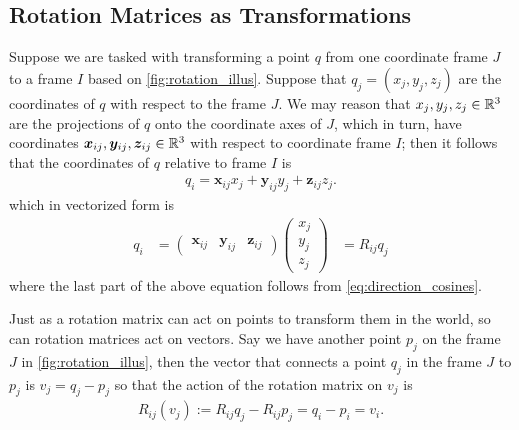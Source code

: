 \subsection{Rotation Matrices as Transformations}
%
Suppose we are tasked with transforming a point $q$ from one coordinate frame  $J$ to a frame $I$ based on  \autoref{fig:rotation_illus}. Suppose that $q_j = (x_j, y_j, z_j)$ are the coordinates of $q$ with respect to the frame $J$. We may reason that $x_j, y_j, z_j \in \mathbb{R}^3$ are the projections of $q$ onto the coordinate axes of $J$, which in turn, have coordinates $\bm{x}_{ij}, \bm{y}_{ij},\bm{z}_{ij} \in \mathbb{R}^3$ with respect to coordinate frame $I$; then it follows that the coordinates of $q$ relative to frame $I$ is
%
\begin{align}
q_i = \bm{x}_{ij} x_j + \bm{y}_{ij} y_j + \bm{z}_{ij} z_j.
\end{align}
%
which in vectorized form is 
%
\begin{align}
q_i & = \left(\begin{array}{ccc}
\bm{x}_{ij} &  \bm{y}_{ij} & \bm{z}_{ij}
\end{array}\right)
%
\left(\begin{array}{c}
x_j \\ y_j \\ z_j
\end{array} \right) 
& = R_{ij}q_j
\end{align}
%
where the last part of the above equation follows from \eqref{eq:direction_cosines}.

Just as a rotation matrix can act on points to transform them in the world, so can rotation matrices act on vectors. Say we have another point $p_j$ on the frame $J$ in \autoref{fig:rotation_illus}, then the vector that connects a point $q_j$ in the frame $J$ to $p_j$ is $v_j = q_j - p_j$ so that the action of the rotation matrix on $v_j$ is
%
\begin{align}
R_{ij}(v_j) := R_{ij} q_j - R_{ij} p_j = q_i - p_i = v_i.
\end{align}


